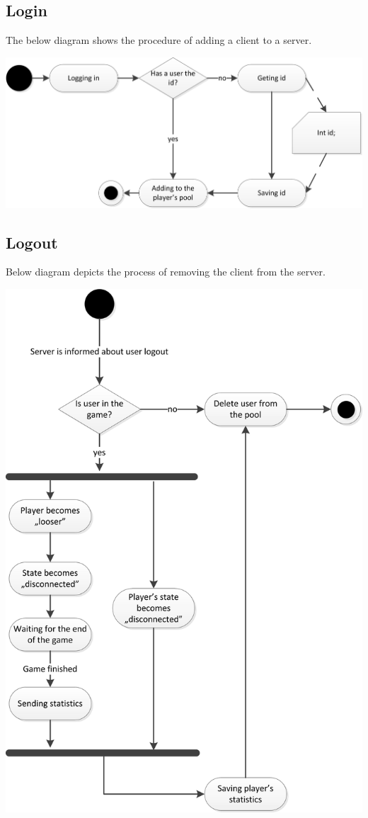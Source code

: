 \documentclass{article}
\begin{document}
\subsection{Login}
The below diagram shows the procedure of adding a client to a server.

\includegraphics[scale=1.00]{UGS_activities_login.jpg}


\pagebreak[4]


\subsection{Logout}
Below diagram depicts the process of removing the client from the server.

\includegraphics[scale=1.00]{UGS_activities_logout.jpg}
\end{document}
